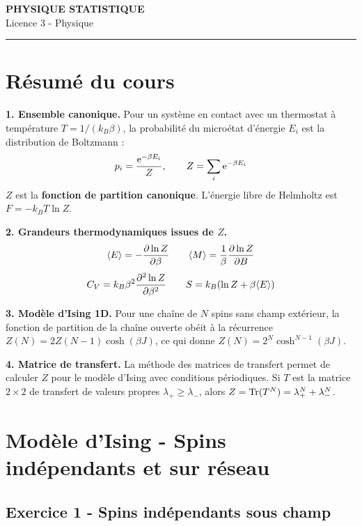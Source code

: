 \documentclass[12pt,a4paper]{article}
\begin{document}
\fi

\begin{center}
  {\LARGE\bfseries PHYSIQUE STATISTIQUE}\\[0.3cm]
  {\normalsize Licence 3 - Physique}\\[0.1cm]
  \rule{0.7\textwidth}{0.8pt}
\end{center}

\vspace{0.3cm}

\section*{Résumé du cours}

\begin{boiteresume}

\textbf{1. Ensemble canonique.} Pour un système en contact avec un thermostat à température $T = 1/(k_B\beta)$, la probabilité du microétat d'énergie $E_i$ est la distribution de Boltzmann :
\[
p_i = \frac{\mathrm{e}^{-\beta E_i}}{Z}, \qquad Z = \sum_i \mathrm{e}^{-\beta E_i}
\]
$Z$ est la \textbf{fonction de partition canonique}. L'énergie libre de Helmholtz est $F = -k_BT\ln Z$.

\textbf{2. Grandeurs thermodynamiques issues de $Z$.}
\[
\langle E\rangle = -\dfrac{\partial \ln Z}{\partial \beta} \qquad \langle M\rangle = \frac{1}{\beta}\dfrac{\partial \ln Z}{\partial B}
\]
\[
C_V = k_B\beta^2\dfrac{\partial ^2\ln Z}{\partial \beta^2} \qquad S = k_B(\ln Z + \beta\langle E\rangle)
\]

\textbf{3. Modèle d'Ising 1D.} Pour une chaîne de $N$ spins sans champ extérieur, la fonction de partition de la chaîne ouverte obéit à la récurrence $Z(N) = 2Z(N-1)\cosh(\beta J)$, ce qui donne $Z(N) = 2^N\cosh^{N-1}(\beta J)$.

\textbf{4. Matrice de transfert.} La méthode des matrices de transfert permet de calculer $Z$ pour le modèle d'Ising avec conditions périodiques. Si $T$ est la matrice $2\times 2$ de transfert de valeurs propres $\lambda_+\geq\lambda_-$, alors $Z = \mathrm{Tr}(T^N) = \lambda_+^N + \lambda_-^N$.

\end{boiteresume}

\newpage

\section{Modèle d'Ising - Spins indépendants et sur réseau}

\subsection*{Exercice 1 - Spins indépendants sous champ \niveau{\moyen}}
\end{document}
